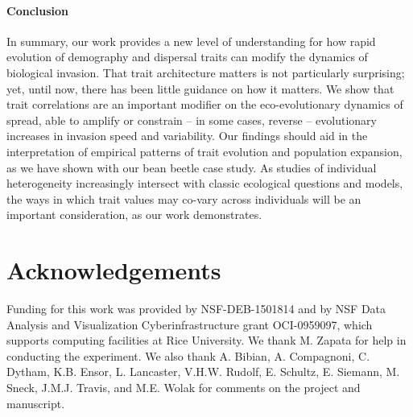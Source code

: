 \documentclass[11pt]{article}
\begin{document}
\paragraph*{Conclusion}
In summary, our work provides a new level of understanding for how rapid evolution of demography and dispersal traits can modify the dynamics of biological invasion.
That trait architecture matters is not particularly surprising; yet, until now, there has been little guidance on how it matters.
We show that trait correlations are an important modifier on the eco-evolutionary dynamics of spread, able to amplify or constrain -- in some cases, reverse -- evolutionary increases in invasion speed and variability.
Our findings should aid in the interpretation of empirical patterns of trait evolution and population expansion, as we have shown with our bean beetle case study.
As studies of individual heterogeneity increasingly intersect with classic ecological questions and models, the ways in which trait values may co-vary across individuals will be an important consideration, as our work demonstrates.

\section*{Acknowledgements}
Funding for this work was provided by NSF-DEB-1501814 and by NSF Data Analysis and Visualization Cyberinfrastructure grant OCI-0959097, which supports computing facilities at Rice University. We thank M. Zapata for help in conducting the experiment. We also thank A. Bibian, A. Compagnoni, C. Dytham, K.B. Ensor, L. Lancaster, V.H.W. Rudolf, E. Schultz, E. Siemann, M. Sneck, J.M.J. Travis, and M.E. Wolak for comments on the project and manuscript.

\newpage{}
\end{document}
